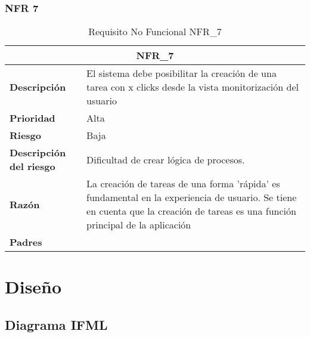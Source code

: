\documentclass{scrreprt}
\begin{document}
\subsection{NFR 7}
    \begin{table}[H]
        \label{tab:my-table}
        \begin{tabular}{|p{5cm}|p{11cm}|}
        \hline
        \multicolumn{2}{|c|}{\textbf{NFR_7}} \\
        \hline
        \textbf{Descripción  }                      &  El sistema debe posibilitar la creación de una tarea con x clicks desde la vista monitorización del usuario                                                                      \\ \hline
        \textbf{Prioridad}                          & Alta                                                                                              \\ \hline
        \textbf{Riesgo}                          & Baja                                                                                                \\ \hline
        \textbf{Descripción del riesgo}                    &  Dificultad de crear lógica de procesos.                          \\ \hline
        \textbf{Razón}                   & La creación de tareas de una forma 'rápida' es fundamental en la experiencia de usuario. Se tiene en cuenta que la creación de tareas es una función principal de la aplicación                                                                                        \\ \hline
        \textbf{Padres}                               &  \\  \hline
        \end{tabular}%
        
        \caption{Requisito No Funcional NFR_7}
\end{table}

\chapter{Diseño}
\section{Diagrama IFML}
\end{document}
